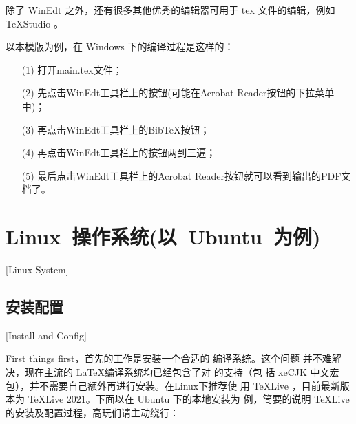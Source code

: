 除了 WinEdt 之外，还有很多其他优秀的编辑器可用于 tex 文件的编辑，例如 TeXStudio 。

以本模版为例，在 Windows 下的编译过程是这样的：
\begin{enumerate}
\item[(1)] 打开main.tex文件；
\item[(2)] 先点击WinEdt工具栏上的\XeLaTeX{}按钮(可能在Acrobat Reader按钮的下拉菜单中)；
\item[(3)] 再点击WinEdt工具栏上的Bib\TeX{}按钮；
\item[(4)] 再点击WinEdt工具栏上的\XeLaTeX{}按钮两到三遍；
\item[(5)] 最后点击WinEdt工具栏上的Acrobat Reader按钮就可以看到输出的PDF文档了。
\end{enumerate}

\section{Linux~操作系统(以~Ubuntu~为例)}[Linux System]

\subsection{安装配置}[Install and Config]

First things first，首先的工作是安装一个合适的 \XeTeX{}编译系统。这个问题
并不难解决，现在主流的 \LaTeX{}编译系统均已经包含了对 \XeTeX{}的支持（包
括 xeCJK 中文宏包），并不需要自己额外再进行安装。在Linux下推荐使
用 \TeX{}Live ，目前最新版本为 \TeX{}Live 2021。下面以在 Ubuntu 下的本地安装为
例，简要的说明 \TeX{}Live 的安装及配置过程，高玩们请主动绕行：

